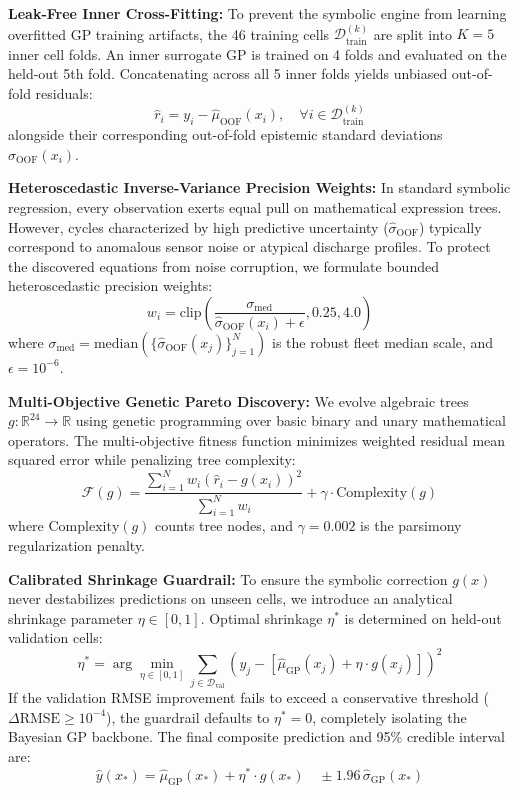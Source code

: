 \documentclass[a4paper,fleqn]{cas-sc}
\begin{document}
\textbf{Leak-Free Inner Cross-Fitting:} To prevent the symbolic engine from learning overfitted GP training artifacts, the 46 training cells $\mathcal{D}_{\text{train}}^{(k)}$ are split into $K=5$ inner cell folds. An inner surrogate GP is trained on 4 folds and evaluated on the held-out 5th fold. Concatenating across all 5 inner folds yields unbiased out-of-fold residuals:
\begin{equation}
    \hat{r}_i = y_i - \hat{\mu}_{\text{OOF}}(x_i), \quad \forall i \in \mathcal{D}_{\text{train}}^{(k)}
\end{equation}
alongside their corresponding out-of-fold epistemic standard deviations $\hat{\sigma}_{\text{OOF}}(x_i)$.

\textbf{Heteroscedastic Inverse-Variance Precision Weights:} In standard symbolic regression, every observation exerts equal pull on mathematical expression trees. However, cycles characterized by high predictive uncertainty ($\hat{\sigma}_{\text{OOF}}$) typically correspond to anomalous sensor noise or atypical discharge profiles. To protect the discovered equations from noise corruption, we formulate bounded heteroscedastic precision weights:
\begin{equation}
    w_i = \text{clip}\left( \frac{\sigma_{\text{med}}}{\hat{\sigma}_{\text{OOF}}(x_i) + \epsilon}, 0.25, 4.0 \right)
\end{equation}
where $\sigma_{\text{med}} = \text{median}(\{\hat{\sigma}_{\text{OOF}}(x_j)\}_{j=1}^N)$ is the robust fleet median scale, and $\epsilon = 10^{-6}$.

\textbf{Multi-Objective Genetic Pareto Discovery:} We evolve algebraic trees $g : \mathbb{R}^{24} \to \mathbb{R}$ using genetic programming over basic binary and unary mathematical operators. The multi-objective fitness function minimizes weighted residual mean squared error while penalizing tree complexity:
\begin{equation}
    \mathcal{F}(g) = \frac{\sum_{i=1}^N w_i \left( \hat{r}_i - g(x_i) \right)^2}{\sum_{i=1}^N w_i} + \gamma \cdot \text{Complexity}(g)
\end{equation}
where $\text{Complexity}(g)$ counts tree nodes, and $\gamma = 0.002$ is the parsimony regularization penalty.

\textbf{Calibrated Shrinkage Guardrail:} To ensure the symbolic correction $g(x)$ never destabilizes predictions on unseen cells, we introduce an analytical shrinkage parameter $\eta \in [0, 1]$. Optimal shrinkage $\eta^*$ is determined on held-out validation cells:
\begin{equation}
    \eta^* = \arg\min_{\eta \in [0, 1]} \sum_{j \in \mathcal{D}_{\text{val}}} \left( y_j - \left[ \hat{\mu}_{\text{GP}}(x_j) + \eta \cdot g(x_j) \right] \right)^2
\end{equation}
If the validation RMSE improvement fails to exceed a conservative threshold ($\Delta \text{RMSE} \ge 10^{-4}$), the guardrail defaults to $\eta^* = 0$, completely isolating the Bayesian GP backbone. The final composite prediction and 95\% credible interval are:
\begin{equation}
    \hat{y}(x_*) = \hat{\mu}_{\text{GP}}(x_*) + \eta^* \cdot g(x_*) \quad \pm 1.96 \, \hat{\sigma}_{\text{GP}}(x_*)
\end{equation}
\end{document}
